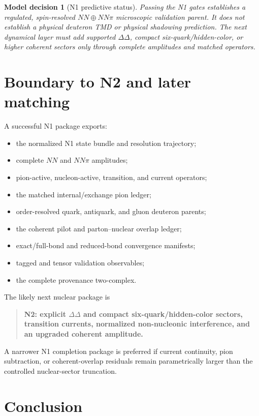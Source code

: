 \documentclass[11pt]{article}
\newtheorem{decision}[definition]{Model decision}
\begin{document}
\begin{decision}[N1 predictive status]
Passing the N1 gates establishes a regulated, spin-resolved
\(NN\oplus NN\pi\) microscopic validation parent.  It does not establish a
physical deuteron TMD or physical shadowing prediction.  The next dynamical
layer must add supported \(\Delta\Delta\), compact six-quark/hidden-color, or
higher coherent sectors only through complete amplitudes and matched
operators.
\end{decision}

\section{Boundary to N2 and later matching}
\label{sec:boundary}

A successful N1 package exports:
\begin{itemize}
\item the normalized N1 state bundle and resolution trajectory;
\item complete \(NN\) and \(NN\pi\) amplitudes;
\item pion-active, nucleon-active, transition, and current operators;
\item the matched internal/exchange pion ledger;
\item order-resolved quark, antiquark, and gluon deuteron parents;
\item the coherent pilot and parton--nuclear overlap ledger;
\item exact/full-bond and reduced-bond convergence manifests;
\item tagged and tensor validation observables;
\item the complete provenance two-complex.
\end{itemize}

The likely next nuclear package is
\begin{quote}
\textbf{N2: explicit \(\Delta\Delta\) and compact six-quark/hidden-color
sectors, transition currents, normalized non-nucleonic interference, and an
upgraded coherent amplitude.}
\end{quote}
A narrower N1 completion package is preferred if current continuity, pion
subtraction, or coherent-overlap residuals remain parametrically larger than
the controlled nuclear-sector truncation.

\section{Conclusion}
\end{document}
